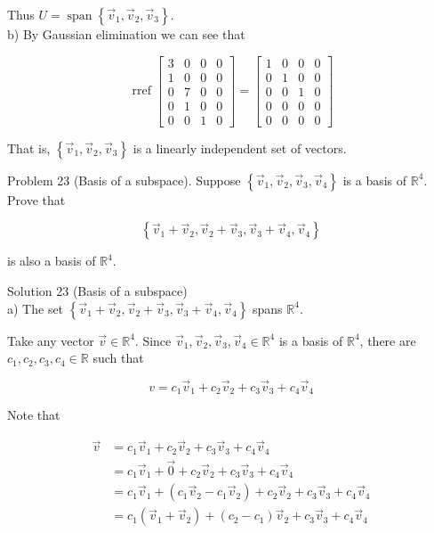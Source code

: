 \documentclass[10pt]{article}
\begin{document}
Thus $U=\operatorname{span}\left\{\vec{v}_{1}, \vec{v}_{2}, \vec{v}_{3}\right\}$.\\
b) By Gaussian elimination we can see that

$$
\operatorname{rref}\left[\begin{array}{lll|l}
3 & 0 & 0 & 0 \\
1 & 0 & 0 & 0 \\
0 & 7 & 0 & 0 \\
0 & 1 & 0 & 0 \\
0 & 0 & 1 & 0
\end{array}\right]=\left[\begin{array}{lll|l}
1 & 0 & 0 & 0 \\
0 & 1 & 0 & 0 \\
0 & 0 & 1 & 0 \\
0 & 0 & 0 & 0 \\
0 & 0 & 0 & 0
\end{array}\right]
$$

That is, $\left\{\vec{v}_{1}, \vec{v}_{2}, \vec{v}_{3}\right\}$ is a linearly independent set of vectors.

Problem 23 (Basis of a subspace). Suppose $\left\{\vec{v}_{1}, \vec{v}_{2}, \vec{v}_{3}, \vec{v}_{4}\right\}$ is a basis of $\mathbb{R}^{4}$. Prove that

$$
\left\{\vec{v}_{1}+\vec{v}_{2}, \vec{v}_{2}+\vec{v}_{3}, \vec{v}_{3}+\vec{v}_{4}, \vec{v}_{4}\right\}
$$

is also a basis of $\mathbb{R}^{4}$.

Solution 23 (Basis of a subspace)\\
a) The set $\left\{\vec{v}_{1}+\vec{v}_{2}, \vec{v}_{2}+\vec{v}_{3}, \vec{v}_{3}+\vec{v}_{4}, \vec{v}_{4}\right\}$ spans $\mathbb{R}^{4}$.

Take any vector $\vec{v} \in \mathbb{R}^{4}$. Since $\vec{v}_{1}, \vec{v}_{2}, \vec{v}_{3}, \vec{v}_{4} \in \mathbb{R}^{4}$ is a basis of $\mathbb{R}^{4}$, there are $c_{1}, c_{2}, c_{3}, c_{4} \in \mathbb{R}$ such that

$$
v=c_{1} \vec{v}_{1}+c_{2} \vec{v}_{2}+c_{3} \vec{v}_{3}+c_{4} \vec{v}_{4}
$$

Note that

$$
\begin{aligned}
\vec{v} & =c_{1} \vec{v}_{1}+c_{2} \vec{v}_{2}+c_{3} \vec{v}_{3}+c_{4} \vec{v}_{4} \\
& =c_{1} \vec{v}_{1}+\overrightarrow{0}+c_{2} \vec{v}_{2}+c_{3} \vec{v}_{3}+c_{4} \vec{v}_{4} \\
& =c_{1} \vec{v}_{1}+\left(c_{1} \vec{v}_{2}-c_{1} \vec{v}_{2}\right)+c_{2} \vec{v}_{2}+c_{3} \vec{v}_{3}+c_{4} \vec{v}_{4} \\
& =c_{1}\left(\vec{v}_{1}+\vec{v}_{2}\right)+\left(c_{2}-c_{1}\right) \vec{v}_{2}+c_{3} \vec{v}_{3}+c_{4} \vec{v}_{4}
\end{aligned}
$$
\end{document}
